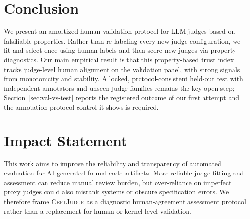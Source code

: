 \documentclass{article}
\begin{document}
\section{Conclusion}
We present an amortized human-validation protocol for LLM judges based on falsifiable properties.
Rather than re-labeling every new judge configuration, we fit and select once using human labels and then score new judges via property diagnostics.
Our main empirical result is that this property-based trust index tracks judge-level human alignment on the validation panel, with strong signals from monotonicity and stability.
A locked, protocol-consistent held-out test with independent annotators and unseen judge families remains the key open step; Section~\ref{sec:val-vs-test} reports the registered outcome of our first attempt and the annotation-protocol control it shows is required.

\section*{Impact Statement}
This work aims to improve the reliability and transparency of automated evaluation for AI-generated formal-code artifacts.
More reliable judge fitting and assessment can reduce manual review burden, but over-reliance on imperfect proxy judges could also misrank systems or obscure specification errors.
We therefore frame \textsc{CertJudge} as a diagnostic human-agreement assessment protocol rather than a replacement for human or kernel-level validation.

\newpage





\end{document}
